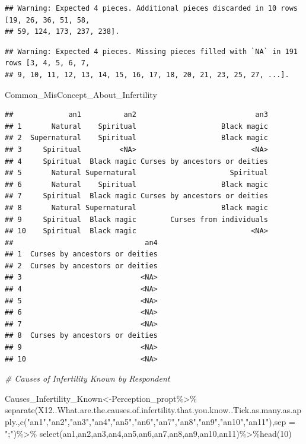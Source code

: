 \documentclass[
]{article}
\newenvironment{Shaded}{\begin{snugshade}}{\end{snugshade}}
\newcommand{\AttributeTok}[1]{\textcolor[rgb]{0.77,0.63,0.00}{#1}}
\newcommand{\CommentTok}[1]{\textcolor[rgb]{0.56,0.35,0.01}{\textit{#1}}}
\newcommand{\DecValTok}[1]{\textcolor[rgb]{0.00,0.00,0.81}{#1}}
\newcommand{\FunctionTok}[1]{\textcolor[rgb]{0.00,0.00,0.00}{#1}}
\newcommand{\NormalTok}[1]{#1}
\newcommand{\OtherTok}[1]{\textcolor[rgb]{0.56,0.35,0.01}{#1}}
\newcommand{\SpecialCharTok}[1]{\textcolor[rgb]{0.00,0.00,0.00}{#1}}
\newcommand{\StringTok}[1]{\textcolor[rgb]{0.31,0.60,0.02}{#1}}
\begin{document}
\begin{verbatim}
## Warning: Expected 4 pieces. Additional pieces discarded in 10 rows [19, 26, 36, 51, 58,
## 59, 124, 173, 237, 238].
\end{verbatim}

\begin{verbatim}
## Warning: Expected 4 pieces. Missing pieces filled with `NA` in 191 rows [3, 4, 5, 6, 7,
## 9, 10, 11, 12, 13, 14, 15, 16, 17, 18, 20, 21, 23, 25, 27, ...].
\end{verbatim}

\begin{Shaded}
\begin{Highlighting}[]
\NormalTok{Common\_MisConcept\_About\_Infertility}
\end{Highlighting}
\end{Shaded}

\begin{verbatim}
##             an1          an2                            an3
## 1       Natural    Spiritual                    Black magic
## 2  Supernatural    Spiritual                    Black magic
## 3     Spiritual         <NA>                           <NA>
## 4     Spiritual  Black magic Curses by ancestors or deities
## 5       Natural Supernatural                      Spiritual
## 6       Natural    Spiritual                    Black magic
## 7     Spiritual  Black magic Curses by ancestors or deities
## 8       Natural Supernatural                    Black magic
## 9     Spiritual  Black magic        Curses from individuals
## 10    Spiritual  Black magic                           <NA>
##                               an4
## 1  Curses by ancestors or deities
## 2  Curses by ancestors or deities
## 3                            <NA>
## 4                            <NA>
## 5                            <NA>
## 6                            <NA>
## 7                            <NA>
## 8  Curses by ancestors or deities
## 9                            <NA>
## 10                           <NA>
\end{verbatim}

\begin{Shaded}
\begin{Highlighting}[]
\CommentTok{\# Causes of Infertility Known by Respondent}

\NormalTok{Causes\_Infertility\_Known}\OtherTok{\textless{}{-}}\NormalTok{Perception\_propt}\SpecialCharTok{\%\textgreater{}\%}
  \FunctionTok{separate}\NormalTok{(X12..What.are.the.causes.of.infertility.that.you.know..Tick.as.many.as.apply.,}\FunctionTok{c}\NormalTok{(}\StringTok{"an1"}\NormalTok{,}\StringTok{"an2"}\NormalTok{,}\StringTok{"an3"}\NormalTok{,}\StringTok{"an4"}\NormalTok{,}\StringTok{"an5"}\NormalTok{,}\StringTok{"an6"}\NormalTok{,}\StringTok{"an7"}\NormalTok{,}\StringTok{"an8"}\NormalTok{,}\StringTok{"an9"}\NormalTok{,}\StringTok{"an10"}\NormalTok{,}\StringTok{"an11"}\NormalTok{),}\AttributeTok{sep =} \StringTok{";"}\NormalTok{)}\SpecialCharTok{\%\textgreater{}\%}
  \FunctionTok{select}\NormalTok{(an1,an2,an3,an4,an5,an6,an7,an8,an9,an10,an11)}\SpecialCharTok{\%\textgreater{}\%}\FunctionTok{head}\NormalTok{(}\DecValTok{10}\NormalTok{)}
\end{Highlighting}
\end{Shaded}
\end{document}
